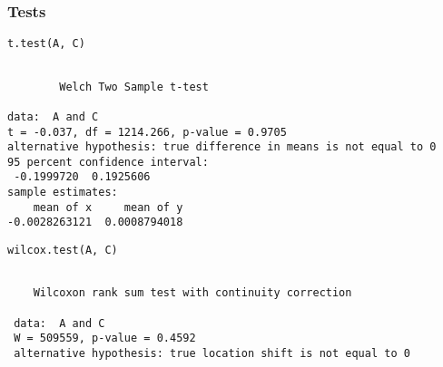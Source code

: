 \documentclass{beamer}
\begin{document}
\begin{frame}[fragile]
\frametitle{Tests}
\label{sec-2-7}


\lstset{language=R}
\begin{lstlisting}
t.test(A, C)
\end{lstlisting}


\begin{verbatim}

        Welch Two Sample t-test

data:  A and C 
t = -0.037, df = 1214.266, p-value = 0.9705
alternative hypothesis: true difference in means is not equal to 0 
95 percent confidence interval:
 -0.1999720  0.1925606 
sample estimates:
    mean of x     mean of y 
-0.0028263121  0.0008794018
\end{verbatim}


\lstset{language=R}
\begin{lstlisting}
wilcox.test(A, C)
\end{lstlisting}

\begin{verbatim}
 
 	Wilcoxon rank sum test with continuity correction
 
 data:  A and C 
 W = 509559, p-value = 0.4592
 alternative hypothesis: true location shift is not equal to 0
\end{verbatim}
\end{frame}
\end{document}
